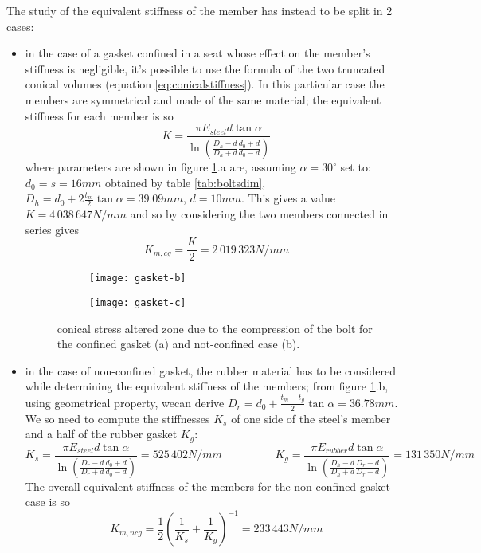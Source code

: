 	The study of the equivalent stiffness of the member has instead to be split in 2 cases:
	\begin{itemize}
		\item in the case of a gasket confined in a seat whose effect on the member's stiffness is negligible, it's possible to use the formula of the two truncated conical volumes (equation \ref{eq:conicalstiffness}). In this particular case the members are symmetrical and made of the same material; the equivalent stiffness for each member is so
		\[ K = \frac{\pi E_{steel} d \tan \alpha}{\ln \left( \frac{D_h - d}{D_h+d} \frac{d_0 + d}{d_0-d} \right)} \]
		where parameters are shown in figure \ref{ex:gasketzone}.a are, assuming $\alpha = 30^\circ$ set to: $d_0 = s = 16mm$ obtained by table \ref{tab:boltsdim}, $D_h = d_0 + 2 \frac {t_m} 2 \tan \alpha = 39.09mm$, $d=10mm$. This gives a value $K = 4\,038\,647 N/mm$ and so by considering the two members connected in series gives
		\[ K_{m,cg} = \frac K 2 = 2\,019\, 323 N/mm \]
		\begin{figure}[b!]
			\begin{subfigure}{0.48\linewidth}
				\centering \texttt{[image: gasket-b]} \caption{}
			\end{subfigure}
			\begin{subfigure}{0.48\linewidth}
				\centering \texttt{[image: gasket-c]} \caption{}
			\end{subfigure}
			\caption{ conical stress altered zone due to the compression of the bolt for the confined gasket (a) and not-confined case (b).} \label{ex:gasketzone}
		\end{figure}
		
		\item in the case of non-confined gasket, the rubber material has to be considered while determining the equivalent stiffness of the members; from figure \ref{ex:gasketzone}.b, using geometrical property,  wecan derive $D_r = d_0 + \frac{t_m-t_g}{2} \tan \alpha = 36.78mm$. We so need to compute the stiffnesses $K_s$ of one side of the steel's member and a half of the rubber gasket $K_g$:
		\[ K_s = \frac{\pi E_{steel} d \tan \alpha}{\ln \left( \frac{D_r - d}{D_r+d} \frac{d_0 + d}{d_0-d} \right)} = 525\, 402 N/mm \hspace{2cm} 
		K_g = \frac{\pi E_{rubber} d \tan \alpha}{\ln \left( \frac{D_h - d}{D_h+d} \frac{D_r + d}{D_r-d} \right)} = 131\,350 N/mm \]
		The overall equivalent stiffness of the members for the non confined gasket case is so
		\[ K_{m,ncg} = \frac 12 \left( \frac 1 {K_s} + \frac 1 {K_g}\right)^{-1} = 233\,443 N/mm \]
	\end{itemize}
